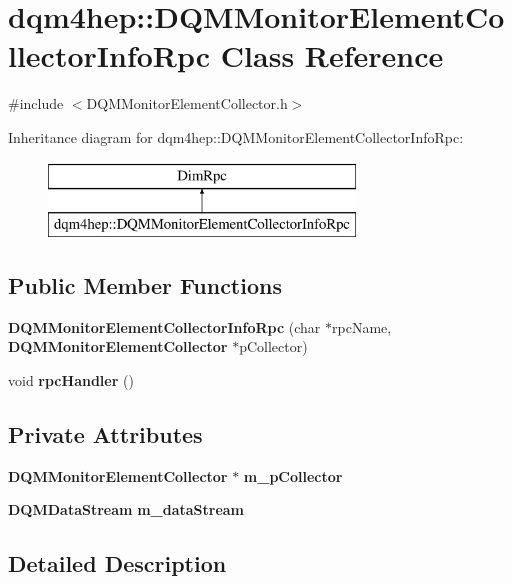 \section{dqm4hep\+:\+:D\+Q\+M\+Monitor\+Element\+Collector\+Info\+Rpc Class Reference}
\label{classdqm4hep_1_1DQMMonitorElementCollectorInfoRpc}


{\ttfamily \#include $<$D\+Q\+M\+Monitor\+Element\+Collector.\+h$>$}

Inheritance diagram for dqm4hep\+:\+:D\+Q\+M\+Monitor\+Element\+Collector\+Info\+Rpc\+:\begin{figure}[H]
\begin{center}
\leavevmode
\includegraphics[height=2.000000cm]{classdqm4hep_1_1DQMMonitorElementCollectorInfoRpc}
\end{center}
\end{figure}
\subsection*{Public Member Functions}
\begin{DoxyCompactItemize}
\item 
{\bf D\+Q\+M\+Monitor\+Element\+Collector\+Info\+Rpc} (char $\ast$rpc\+Name, {\bf D\+Q\+M\+Monitor\+Element\+Collector} $\ast$p\+Collector)
\item 
void {\bf rpc\+Handler} ()
\end{DoxyCompactItemize}
\subsection*{Private Attributes}
\begin{DoxyCompactItemize}
\item 
{\bf D\+Q\+M\+Monitor\+Element\+Collector} $\ast$ {\bf m\+\_\+p\+Collector}
\item 
{\bf D\+Q\+M\+Data\+Stream} {\bf m\+\_\+data\+Stream}
\end{DoxyCompactItemize}


\subsection{Detailed Description}


